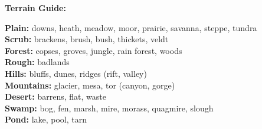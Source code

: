 \documentclass[../main.tex]{subfiles}
\begin{document}
\fontsize{7.5}{8}
\begin{framed}
\noindent\textcolor{dndblue}{\textbf{Terrain Guide:}}
\begin{multicols}{4}
\fontsize{7.5}{8}
\noindent\textcolor{dndblue}{\textbf{Plain:}} downs, heath, meadow, moor, prairie, savanna, steppe, tundra\\
\columnbreak
\noindent\textcolor{dndblue}{\textbf{Scrub:}} brackens, brush, bush, thickets, veldt\\
\textcolor{dndblue}{\textbf{Forest:}} copses, groves, jungle, rain forest, woods\\
\textcolor{dndblue}{\textbf{Rough:}} badlands\\
\columnbreak
\noindent\textcolor{dndblue}{\textbf{Hills:}} bluffs, dunes, ridges (rift, valley)\\
\textcolor{dndblue}{\textbf{Mountains:}} glacier, mesa, tor (canyon, gorge)\\
\textcolor{dndblue}{\textbf{Desert:}} barrens, flat, waste\\
\columnbreak
\noindent\textcolor{dndblue}{\textbf{Swamp:}} bog, fen, marsh, mire, morass, quagmire, slough\\
\textcolor{dndblue}{\textbf{Pond:}} lake, pool, tarn
\end{multicols}
\end{framed}
\setlength{\columnsep}{8pt}
\end{document}
